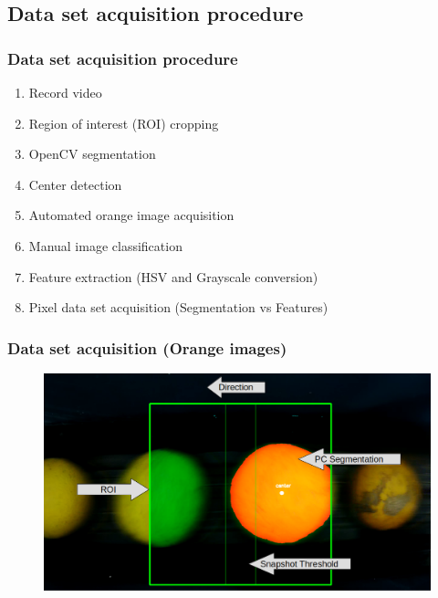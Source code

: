 \documentclass[
serif,
compress,
xcolor=table,
dvipsnames,
]{beamer}
\begin{document}
\subsection{Data set acquisition procedure}
\begin{frame}
\frametitle{Data set acquisition procedure}
\begin{enumerate}
 \item Record video
 \item Region of interest (ROI) cropping
 \item OpenCV segmentation
 \item Center detection
 \item Automated orange image acquisition
 \item Manual image classification
 \item Feature extraction (HSV and Grayscale conversion)
 \item Pixel data set acquisition (Segmentation vs Features)
\end{enumerate}
\end{frame}

\begin{frame}
\frametitle{Data set acquisition (Orange images)}
    \begin{figure}[h]
    \centering
    \includegraphics[width=\linewidth]{framito2.png}  
    \label{vaf}
    \end{figure}
\end{frame}
\end{document}
